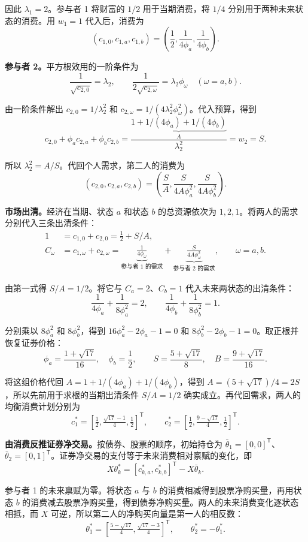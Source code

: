 \begin{tcolorbox}[example]
\begin{solution}[blank-type=manual,blank-vsep=7\baselineskip]
因此 $\lambda_1=2$。参与者 1 将财富的 $1/2$ 用于当期消费，将 $1/4$ 分别用于两种未来状态的消费。用 $w_1=1$ 代入后，消费为
\[
 (c_{1,0},c_{1,a},c_{1,b})
 =\left(\frac12,\frac1{4\phi_a},\frac1{4\phi_b}\right).
\]

\textbf{参与者 2。}平方根效用的一阶条件为
\[
 \frac1{\sqrt{c_{2,0}}}=\lambda_2,\qquad
 \frac1{2\sqrt{c_{2,\omega}}}=\lambda_2\phi_\omega
 \quad(\omega=a,b).
\]

由一阶条件解出 $c_{2,0}=1/\lambda_2^2$ 和 $c_{2,\omega}=1/(4\lambda_2^2\phi_\omega^2)$。代入预算，得到
\[
 c_{2,0}+\phi_a c_{2,a}+\phi_b c_{2,b}
 =\frac{\underbrace{1+1/(4\phi_a)+1/(4\phi_b)}_{A}}{\lambda_2^2}
 =w_2=S.
\]

所以 $\lambda_2^2=A/S$。代回个人需求，第二人的消费为
\[
 (c_{2,0},c_{2,a},c_{2,b})
 =\left(\frac SA,\frac S{4A\phi_a^2},\frac S{4A\phi_b^2}\right).
\]

\textbf{市场出清。}经济在当期、状态 $a$ 和状态 $b$ 的总资源依次为 $1,2,1$。将两人的需求分别代入三条出清条件：
\[
 \begin{aligned}
 1&=c_{1,0}+c_{2,0}=\tfrac12+S/A,\\
 C_\omega&=c_{1,\omega}+c_{2,\omega}
 =\underbrace{\frac{1}{4\phi_\omega}}_{\text{参与者 1 的需求}}
  +\underbrace{\frac{S}{4A\phi_\omega^2}}_{\text{参与者 2 的需求}},
 \qquad \omega=a,b.
 \end{aligned}
\]

由第一式得 $S/A=1/2$。将它与 $C_a=2$、$C_b=1$ 代入未来两状态的出清条件：
\[
 \frac1{4\phi_a}+\frac1{8\phi_a^2}=2,\qquad
 \frac1{4\phi_b}+\frac1{8\phi_b^2}=1.
\]

分别乘以 $8\phi_a^2$ 和 $8\phi_b^2$，得到 $16\phi_a^2-2\phi_a-1=0$ 和 $8\phi_b^2-2\phi_b-1=0$。取正根并恢复证券价格：
\[
 \phi_a=\frac{1+\sqrt{17}}{16},\quad\phi_b=\frac12,\qquad
 S=\frac{5+\sqrt{17}}8,\quad B=\frac{9+\sqrt{17}}{16}.
\]

将这组价格代回 $A=1+1/(4\phi_a)+1/(4\phi_b)$，得到 $A=(5+\sqrt{17})/4=2S$，所以先前用于求根的当期出清条件 $S/A=1/2$ 确实成立。再代回需求，两人的均衡消费计划分别为
\[
 c_1^*=\left[\tfrac12,\tfrac{\sqrt{17}-1}{4},\tfrac12\right]^{\mathsf T},
 \qquad
 c_2^*=\left[\tfrac12,\tfrac{9-\sqrt{17}}4,\tfrac12\right]^{\mathsf T}.
\]

\textbf{由消费反推证券净交易。}按债券、股票的顺序，初始持仓为 $\bar\theta_1=[0,0]^{\mathsf T}$、$\bar\theta_2=[0,1]^{\mathsf T}$。证券净交易的支付等于未来消费相对禀赋的变化，即
\[
 X\theta_k^*=[c_{k,a}^*,c_{k,b}^*]^{\mathsf T}-X\bar\theta_k.
\]

参与者 1 的未来禀赋为零。将状态 $a$ 与 $b$ 的消费相减得到股票净购买量，再用状态 $b$ 的消费减去股票净购买量，得到债券净购买量。两人的未来消费变化逐状态相抵，而 $X$ 可逆，所以第二人的净购买向量是第一人的相反数：
\[
 \theta_1^*=\left[\tfrac{5-\sqrt{17}}4,\tfrac{\sqrt{17}-3}4\right]^{\mathsf T},
 \qquad \theta_2^*=-\theta_1^*.
\]


\end{solution}
\end{tcolorbox}
